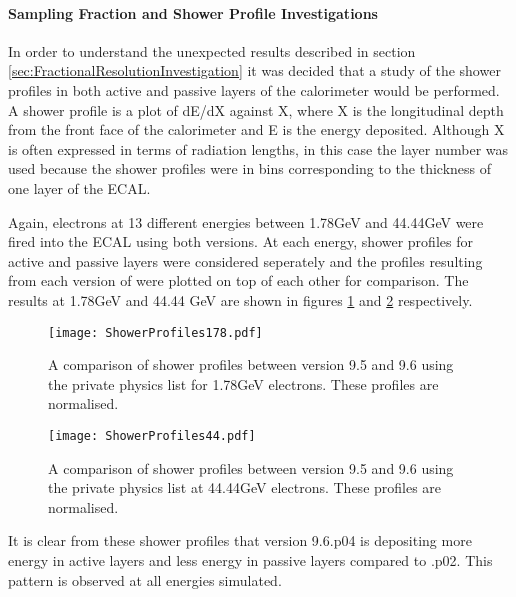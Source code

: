 \paragraph{Sampling Fraction and Shower Profile Investigations}
\label{sec:Sampling Fraction and Shower Profile Investigations}
In order to understand the unexpected results described in section \ref{sec:FractionalResolutionInvestigation} it was decided that a study of the shower profiles in both active and passive layers of the calorimeter would be performed.  A shower profile is a plot of dE/dX against X, where X is the longitudinal depth from the front face of the calorimeter and E is the energy deposited.  Although X is often expressed in terms of radiation lengths, in this case the layer number was used because the shower profiles were in bins corresponding to the thickness of one layer of the ECAL.

Again, electrons at 13 different energies between 1.78GeV and 44.44GeV were fired into the ECAL using both \geant versions.  At each energy, shower profiles for active and passive layers were considered seperately and the profiles resulting from each version of \geant were plotted on top of each other for comparison.  The results at 1.78GeV and 44.44 GeV are shown in figures \ref{fig:1.78sp} and \ref{fig:44.44sp} respectively.
\begin{figure}[h]
  \centering
  \texttt{[image: ShowerProfiles178.pdf]}
  \caption{A comparison of shower profiles between \geant version 9.5 and 9.6 using the \lhcb private physics list for 1.78GeV electrons.  These profiles are normalised.}
    \label{fig:1.78sp}
\end{figure}
\begin{figure}[h]
  \centering
  \texttt{[image: ShowerProfiles44.pdf]}
  \caption{A comparison of shower profiles between \geant version 9.5 and 9.6 using the \lhcb private physics list at 44.44GeV electrons. These profiles are normalised.}
    \label{fig:44.44sp}
\end{figure}

It is clear from these shower profiles that \geant version 9.6.p04 is depositing more energy in active layers and less energy in passive layers compared to .p02.  This pattern is observed at all energies simulated.


